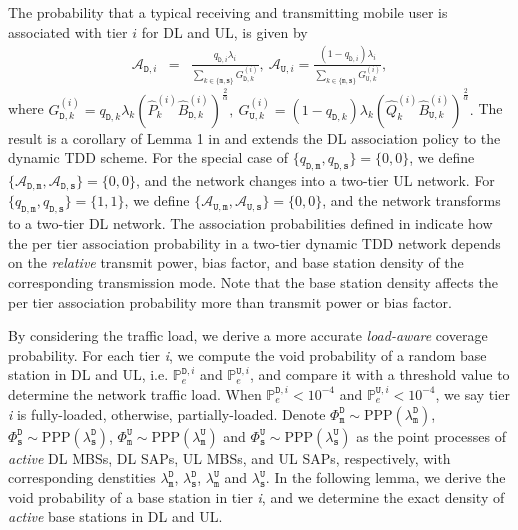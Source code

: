 \documentclass[twocolumn,english]{IEEEtran}
\theoremstyle{plain}
\theoremstyle{definition}
\begin{document}
The probability that a typical receiving and transmitting mobile user
is associated with tier $i$ for DL and UL, is given by
\begin{eqnarray}
\mathcal{A}_{\mathtt{D},i} & = & \frac{q_{\mathtt{D},i}\lambda_{i}}{\sum_{k\in\{\mathtt{m},\mathtt{s}\}}G_{\mathtt{D},k}^{(i)}},\:\mathcal{A}_{\mathtt{U},i}=\frac{\left(1-q_{\mathtt{D},i}\right)\lambda_{i}}{\sum_{k\in\{\mathtt{m},\mathtt{s}\}}G_{\mathtt{U},k}^{(i)}},\label{eq:Asso_D_U}
\end{eqnarray}
where $G_{\mathtt{D},k}^{(i)}=q_{\mathtt{D},k}\lambda_{k}\left(\hat{P}_{k}^{(i)}\hat{B}_{\mathtt{D},k}^{(i)}\right)^{\frac{2}{\alpha}},\: G_{\mathtt{U},k}^{(i)}=\left(1-q_{\mathtt{D},k}\right)\lambda_{k}\left(\hat{Q}_{k}^{(i)}\hat{B}_{\mathtt{U},k}^{(i)}\right)^{\frac{2}{\alpha}}.$
The result is a corollary of Lemma 1 in \cite{HCNW} and extends the
DL association policy to the dynamic TDD scheme. For the special case
of $\{q_{\mathtt{D,m}},q_{\mathtt{D,s}}\}=\{0,0\}$, we define $\{\mathcal{A}_{\mathtt{D},\mathtt{m}},\mathcal{A}_{\mathtt{D},\mathtt{s}}\}=\{0,0\}$,
and the network changes into a two-tier UL network. For $\{q_{\mathtt{D,m}},q_{\mathtt{D,s}}\}=\{1,1\}$,
we define $\{\mathcal{A}_{\mathtt{U},\mathtt{m}},\mathcal{A}_{\mathtt{U},\mathtt{s}}\}=\{0,0\}$,
and the network transforms to a two-tier DL network. The association
probabilities defined in  indicate how the
per tier association probability in a two-tier dynamic TDD network
depends on the \emph{relative} transmit power, bias factor, and base
station density of the corresponding transmission mode. Note that
the base station density affects the per tier association probability
more than transmit power or bias factor.

By considering the traffic load, we derive a more accurate \emph{load-aware}
coverage probability. For each tier \emph{i}, we compute the void
probability of a random base station in DL and UL, i.e. $\mathbb{P}_{\mathit{\mathit{e}}}^{\mathtt{D},i}$
and $\mathbb{P}_{\mathit{\mathit{e}}}^{\mathtt{U},i}$, and compare
it with a threshold value to determine the network traffic load. When
$\mathbb{P}_{\mathit{\mathit{e}}}^{\mathtt{D},i}<10^{-4}$ and $\mathbb{P}_{\mathit{\mathit{e}}}^{\mathtt{U},i}<10^{-4}$,
we say tier \emph{i} is fully-loaded, otherwise, partially-loaded.
Denote $\Phi_{\mathtt{m}}^{\mathtt{D}}\sim\textrm{PPP}(\lambda_{\mathtt{m}}^{\mathtt{D}})$,
$\Phi_{\mathtt{s}}^{\mathtt{D}}\sim\textrm{PPP}(\lambda_{\mathtt{s}}^{\mathtt{D}})$,
$\Phi_{\mathtt{m}}^{\mathtt{U}}\sim\textrm{PPP}(\lambda_{\mathtt{m}}^{\mathtt{U}})$
and $\Phi_{\mathtt{s}}^{\mathtt{U}}\sim\textrm{PPP}(\lambda_{\mathtt{s}}^{\mathtt{U}})$
as the point processes of \emph{active} DL MBSs, DL SAPs, UL MBSs,
and UL SAPs, respectively, with corresponding denstities $\lambda_{\mathtt{m}}^{\mathtt{D}}$,
$\lambda_{\mathtt{s}}^{\mathtt{D}}$, $\lambda_{\mathtt{m}}^{\mathtt{U}}$
and $\lambda_{\mathtt{s}}^{\mathtt{U}}$. In the following lemma,
we derive the void probability of a base station in tier \emph{i},
and we determine the exact density of \emph{active} base stations
in DL and UL.
\end{document}
